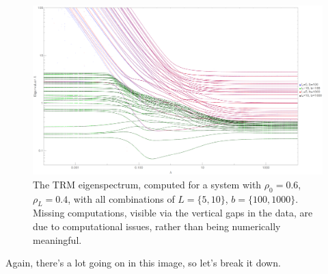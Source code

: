  \begin{figure}[h!]
 \caption[The TRM eigenspectrum for a system with $L=\{5, 10\}, $, $b=\{100, 1000\}$.]{\label{fig:eigsVarBVarL} 
 The TRM eigenspectrum, computed for a system with $\rho_0 = 0.6$, $\rho_L = 0.4$,
 with all combinations of
 $L=\{5, 10\}$, $b=\{100, 1000\}$. Missing computations, visible via the vertical gaps in
 the data, are due to computational issues, rather than being numerically meaningful.
 }
  \begin{center}
 \includegraphics[width=1.0\textheight, angle=270]{TRM/images/repeatRepeatMultEig}
  \end{center}
\end{figure}
Again, there's a lot going on in this image, so let's break it down.
